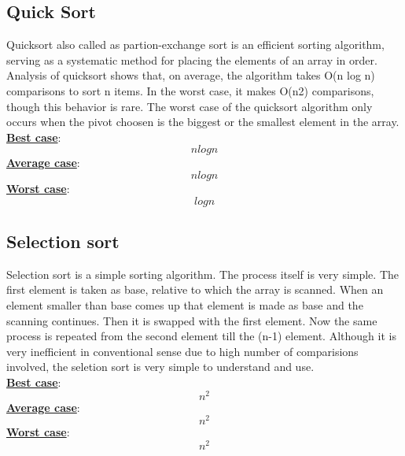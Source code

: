 \documentclass{IEEEtran}
\begin{document}
\subsection{Quick Sort}
Quicksort also called as partion-exchange sort is an efficient sorting algorithm, serving as a systematic method for placing the elements of an array in order. Analysis of quicksort shows that, on average, the algorithm takes O(n log n) comparisons to sort n items. In the worst case, it makes O(n2) comparisons, though this behavior is rare. The worst case of the quicksort algorithm only occurs when the pivot choosen is the biggest or the smallest element in the array.\\
\textbf{\underline{Best case}}: \[n log n\]
\textbf{\underline{Average case}}: \[n log n\] 
\textbf{\underline{Worst case}}:\[log n\]

\subsection{Selection sort}
Selection sort is a simple sorting algorithm. The process itself is very simple. The first element is taken as base, relative to which the array is scanned. When an element smaller than base comes up that element is made as base and the scanning continues. Then it is swapped with the first element. Now the same process is repeated from the second element till the (n-1) element. Although it is very inefficient in conventional sense due to high number of comparisions involved, the seletion sort is very simple to understand and use.\\
\textbf{\underline{Best case}}: \[n^2\]
\textbf{\underline{Average case}}: \[n^2\] 
\textbf{\underline{Worst case}}:\[n^2\]
\end{document}

